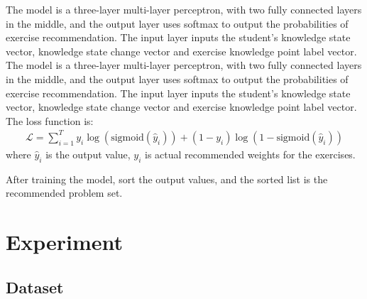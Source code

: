 The model is a three-layer multi-layer perceptron, with two fully connected layers in the middle, and the output layer uses softmax to output the probabilities of exercise recommendation. The input layer inputs the student's knowledge state vector, knowledge state change vector and exercise knowledge point label vector. The model is a three-layer multi-layer perceptron, with two fully connected layers in the middle, and the output layer uses softmax to output the probabilities of exercise recommendation. The input layer inputs the student's knowledge state vector, knowledge state change vector and exercise knowledge point label vector. The loss function is:
\begin{align}
  \mathcal{L}=\sum_{i=1}^{T} y_i \log (\text{sigmoid}(\hat{y}_i))+(1-y_i ) \log (1-\text{sigmoid}(\hat{y}_i))
\end{align}
where \(\hat{y}_i\) is the output value, \(y_i\) is actual recommended weights for the exercises.

After training the model, sort the output values, and the sorted list is the recommended problem set.


\section{Experiment}
\subsection{Dataset}

